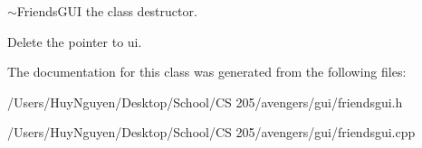 $\sim$\+Friends\+G\+UI the class destructor. 

Delete the pointer to ui. 

The documentation for this class was generated from the following files\+:\begin{DoxyCompactItemize}
\item 
/\+Users/\+Huy\+Nguyen/\+Desktop/\+School/\+C\+S 205/avengers/gui/friendsgui.\+h\item 
/\+Users/\+Huy\+Nguyen/\+Desktop/\+School/\+C\+S 205/avengers/gui/friendsgui.\+cpp\end{DoxyCompactItemize}
